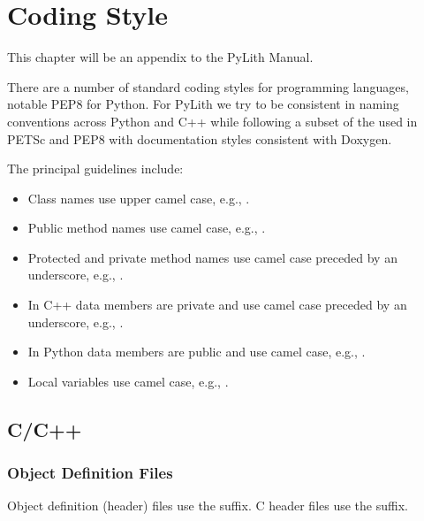 \chapter{Coding Style}
\label{cha:code:style}

This chapter will be an appendix to the PyLith Manual.

There are a number of standard coding styles for programming
languages, notable PEP8 for Python. For PyLith we try to be consistent
in naming conventions across Python and C++ while following a subset
of the used in PETSc and PEP8 with documentation styles consistent
with Doxygen.


The principal guidelines include:
\begin{itemize}
\item Class names use upper camel case, e.g., .
\item Public method names use camel case, e.g.,
  .
\item Protected and private method names use camel case preceded by an
  underscore, e.g., .
\item In C++ data members are private and use camel case preceded by
  an underscore, e.g., .
\item In Python data members are public and use camel case, e.g., .
\item Local variables use camel case, e.g., .
\end{itemize}

\section{C/C++}

\subsection{Object Definition Files}

Object definition (header) files use the  suffix. C
header files use the  suffix.


